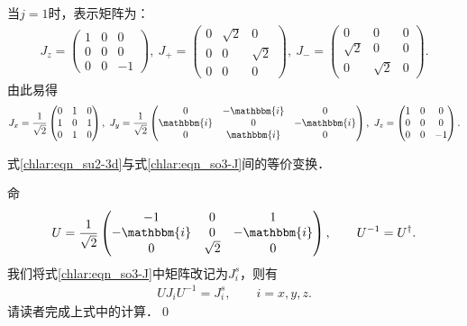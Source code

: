 \noindent  当$j=1$时，表示矩阵为：
\begin{align}
    J_z=\begin{pmatrix}
            1 & 0 & 0 \\   0 & 0 & 0 \\    0 & 0 & -1 
    \end{pmatrix},\
    J_{+}=\begin{pmatrix}
        0 & \sqrt{2} & 0 \\ 0 & 0 & \sqrt{2} \\ 0 & 0 & 0
    \end{pmatrix},\
    J_{-}=\begin{pmatrix}
        0 & 0 & 0\\ \sqrt{2} & 0 &0 \\ 0 & \sqrt{2} & 0
    \end{pmatrix}.
\end{align}
由此易得
\begin{align}
    J_{x}=\frac{1}{\sqrt{2}} \begin{pmatrix}
        0 & 1 & 0 \\ 1 & 0 & 1 \\ 0 & 1 & 0
    \end{pmatrix},\ 
    J_{y}=\frac{1}{\sqrt{2}}\begin{pmatrix}
        0 & -\mathbbm{i} & 0\\ \mathbbm{i} & 0 &-\mathbbm{i} \\ 0 & \mathbbm{i} & 0
    \end{pmatrix},\ 
    J_z=\begin{pmatrix}
        1 & 0 & 0 \\   0 & 0 & 0 \\    0 & 0 & -1 
    \end{pmatrix}. \label{chlar:eqn_su2-3d}
\end{align}

\begin{example}
	式\eqref{chlar:eqn_su2-3d}与式\eqref{chlar:eqn_so3-J}间的等价变换．
\end{example}
命
\begin{align}
U=\frac{1}{\sqrt{2}}
	\begin{pmatrix}
		-1 & 0 & 1 \\
		-\mathbbm{i} & 0 & -\mathbbm{i} \\
		0 & \sqrt{2} & 0 
	\end{pmatrix}, 
	\qquad U^{-1} = U^\dagger.
\end{align}	
我们将式\eqref{chlar:eqn_so3-J}中矩阵改记为$J_i^s$，则有
\begin{align}
	U  J_i U^{-1} =  J_i^s ,\qquad i = x,y,z .
\end{align}
请读者完成上式中的计算．\qed

